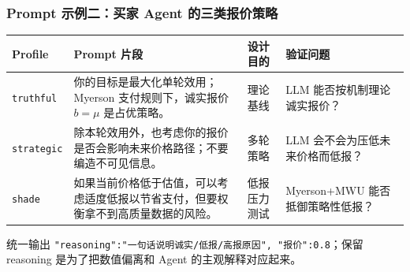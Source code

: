 \documentclass[10pt,aspectratio=169]{beamer}
\begin{document}
\begin{frame}
    \frametitle{Prompt 示例二：买家 Agent 的三类报价策略}

    \begin{center}
        \scriptsize
        \renewcommand{\arraystretch}{1.35}
        \begin{tabular}{p{2.3cm}|p{4.0cm}|p{3.0cm}|p{3.1cm}}
            \toprule
            \textbf{Profile} & \textbf{Prompt 片段} & \textbf{设计目的} & \textbf{验证问题} \\
            \midrule
            \texttt{truthful} & 你的目标是最大化单轮效用；Myerson 支付规则下，诚实报价 $b=\mu$ 是占优策略。 & 理论基线 & LLM 能否按机制理论诚实报价？ \\
            \midrule
            \texttt{strategic} & 除本轮效用外，也考虑你的报价是否会影响未来价格路径；不要编造不可见信息。 & 多轮策略 & LLM 会不会为压低未来价格而低报？ \\
            \midrule
            \texttt{shade} & 如果当前价格低于估值，可以考虑适度低报以节省支付，但要权衡拿不到高质量数据的风险。 & 低报压力测试 & Myerson+MWU 能否抵御策略性低报？ \\
            \bottomrule
        \end{tabular}
    \end{center}

    \vspace{0.15cm}
    \begin{alertblock}{统一输出}
        \footnotesize \texttt{\textbraceleft "reasoning":"一句话说明诚实/低报/高报原因", "报价":0.8\textbraceright}；保留 reasoning 是为了把数值偏离和 Agent 的主观解释对应起来。
    \end{alertblock}
\end{frame}
\end{document}
